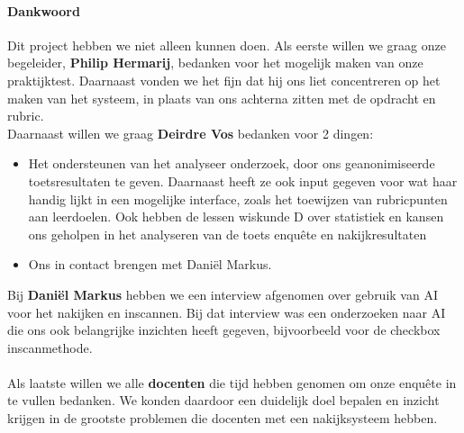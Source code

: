 \documentclass[12pt]{article}
\begin{document}
\begin{multicols}{2}
\paragraph*{Dankwoord} 
Dit project hebben we niet alleen kunnen doen. Als eerste willen we graag onze begeleider, \textbf{Philip Hermarij}, bedanken voor het mogelijk maken van onze praktijktest. Daarnaast vonden we het fijn dat hij ons liet concentreren op het maken van het systeem, in plaats van ons achterna zitten met de opdracht en rubric.\\
Daarnaast willen we graag \textbf{Deirdre Vos} bedanken voor 2 dingen:
\noindent\begin{itemize}
    \item  Het ondersteunen van het analyseer onderzoek, door ons geanonimiseerde toetsresultaten te geven. Daarnaast heeft ze ook input gegeven voor wat haar handig lijkt in een mogelijke interface, zoals het toewijzen van rubricpunten aan leerdoelen. Ook hebben de lessen wiskunde D over statistiek en kansen ons geholpen in het analyseren van de toets enquête en nakijkresultaten\\
    \item Ons in contact brengen met Daniël Markus. 
\end{itemize}
Bij \textbf{Daniël Markus} hebben we een interview afgenomen over gebruik van AI voor het nakijken en inscannen. Bij dat interview was een onderzoeken naar AI die ons ook belangrijke inzichten heeft gegeven, bijvoorbeeld voor de checkbox inscanmethode.\\
\\
Als laatste willen we alle \textbf{docenten} die tijd hebben genomen om onze enquête in te vullen  bedanken. We konden daardoor een duidelijk doel bepalen en inzicht krijgen in de grootste problemen die docenten met een nakijksysteem hebben.


\end{multicols}

\pagebreak
\end{document}
